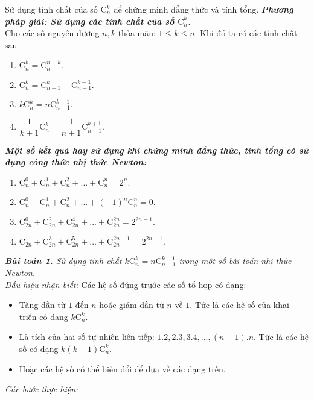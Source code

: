 \begin{dang}{Sử dụng tính chất của số $\mathrm{C}_n^k$ để chứng minh đẳng thức và tính tổng.}%
    \textbf{\textit{Phương pháp giải: Sử dụng các tính chất của số $\mathrm{C}_n^k$.
    }}\\
    Cho các số nguyên dương $n,k$ thỏa mãn: $1\le k\le n$. Khi đó ta có các tính chất sau
    \begin{enumerate}
        \item $\mathrm{C}_n^k=\mathrm{C}_n^{n-k}.$
        \item $\mathrm{C}_n^k=\mathrm{C}_{n-1}^k+\mathrm{C}_{n-1}^{k-1}.$
        \item $k \mathrm{C}_n^k=n \mathrm{C}_{n-1}^{k-1}.$
        \item $\dfrac1{k+1} \mathrm{C}_n^k=\dfrac1{n+1} \mathrm{C}_{n+1}^{k+1}.$
    \end{enumerate}
    \textbf{\textit{Một số kết quả hay sử dụng khi chứng minh đẳng thức, tính tổng có sử dụng công thức nhị thức Newton:}}
    \begin{enumerate}
        \item $ \mathrm{C}_n^0+\mathrm{C}_n^1+\mathrm{C}_n^2+...+\mathrm{C}_n^n=2^n.$
        \item $\mathrm{C}_n^0-\mathrm{C}_n^1+\mathrm{C}_n^2+...+\left(-1\right)^n\mathrm{C}_n^n=0.$
        \item $\mathrm{C}_{2n}^0+\mathrm{C}_{2n}^2+\mathrm{C}_{2n}^{4}+...+\mathrm{C}_{2n}^{2n}=2^{2n-1}.$ 
        \item $\mathrm{C}_{2n}^1+\mathrm{C}_{2n}^{3}+\mathrm{C}_{2n}^{5}+...+\mathrm{C}_{2n}^{2n-1}=2^{2n-1}.$ 
    \end{enumerate}
    \textit{\textbf{Bài toán 1.} Sử dụng tính chất $k \mathrm{C}_n^k=n \mathrm{C}_{n-1}^{k-1}$ trong một số bài toán nhị thức Newton.}\\
    \textit{Dấu hiệu nhận biết:} Các hệ số đứng trước các số tổ hợp có dạng:
    \begin{itemize}
        \item Tăng dần từ $1$ đến $n$ hoặc giảm dần từ $n$ về $1$. Tức là các hệ số của khai triển có dạng $k \mathrm{C}_n^{k}$.
        \item Là tích của hai số tự nhiên liên tiếp: $1.2, 2.3, 3.4,..., (n-1).n$. Tức là các hệ số có dạng
        $k(k-1) \mathrm{C}_n^{k}$.
        \item Hoặc các hệ số có thể biến đổi để dưa về các dạng trên. 
    \end{itemize}
    \textit{Các bước thực hiện:}

\end{dang}
